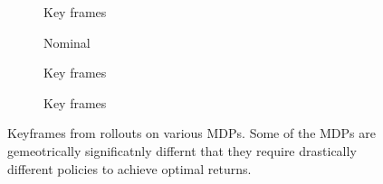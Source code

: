 \documentclass{article}
\begin{document}
\begin{figure}[t!]
\begin{centering}
\begin{subfigure}[b]{0.3\columnwidth}
\caption{Key frames}
\end{subfigure}
\vfill
\begin{subfigure}[b]{0.3\columnwidth}
\caption{Nominal}
\end{subfigure}
\hfill
\begin{subfigure}[b]{0.3\columnwidth}
\caption{Key frames}
\end{subfigure}
\hfill
\begin{subfigure}[b]{0.3\columnwidth}
\caption{Key frames}
\end{subfigure}
\caption{Keyframes from rollouts on various MDPs. Some of the MDPs are gemeotrically significatnly differnt that they require drastically different policies to achieve optimal returns.}
\end{centering}
\end{figure}


\end{document}
